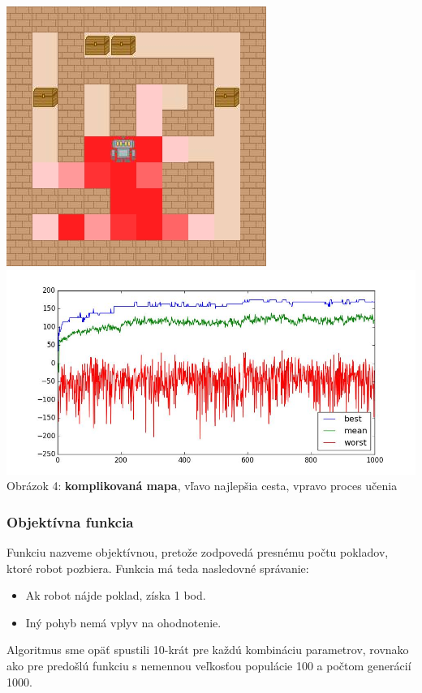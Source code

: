\documentclass[10pt]{paper}
\begin{document}
\begin{center}
  \includegraphics[scale=0.4]{strategy1_complicated.png} 
  \includegraphics[scale=0.3]{strategy1_complicated_graph.png} \\
   Obrázok 4: \textbf{komplikovaná mapa}, vľavo najlepšia cesta, vpravo proces učenia
\end{center}

\subsubsection{Objektívna funkcia}
Funkciu nazveme objektívnou, pretože zodpovedá presnému počtu pokladov, ktoré robot pozbiera. Funkcia má teda nasledovné správanie:
\begin{itemize}[noitemsep]
\item Ak robot nájde poklad, získa 1 bod.
\item Iný pohyb nemá vplyv na ohodnotenie.
\end{itemize} 

Algoritmus sme opäť spustili 10-krát pre každú kombináciu parametrov, rovnako ako pre predošlú funkciu s nemennou veľkosťou populácie 100 a počtom generácií 1000.
\end{document}
